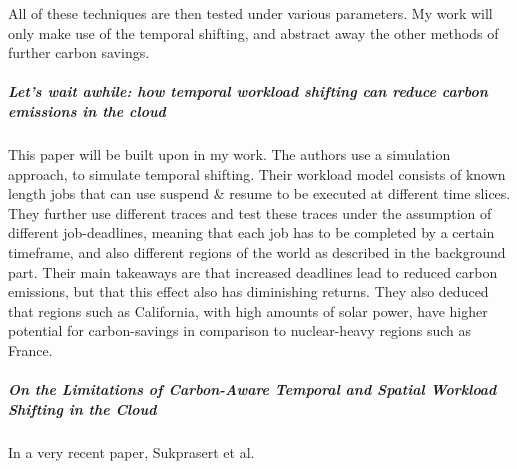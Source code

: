 All of these techniques are then tested under various parameters. My work will only make use of the temporal shifting, and abstract away the other methods of further carbon savings.

\subparagraph{Let's wait awhile: how temporal workload shifting can reduce carbon emissions in the cloud} This paper will be built upon in my work.
The authors \cite{wiesner_lets_2021} use a simulation approach, to simulate temporal shifting. Their workload model consists of known length jobs that can use suspend \& resume to be executed at different time slices. 
They further use different traces and test these traces under the assumption of different job-deadlines, meaning that each job has to be completed by a certain timeframe, and also different regions of the world as described in the background part. 
Their main takeaways are that increased deadlines lead to reduced carbon emissions, but that this effect also has diminishing returns. 
They also deduced that regions such as California, with high amounts of solar power, have higher potential for carbon-savings in comparison to nuclear-heavy regions such as France.

\subparagraph{On the Limitations of Carbon-Aware Temporal and Spatial Workload Shifting in the Cloud} 
In a very recent paper, Sukprasert et al. \cite{sukprasert_limitations_2024}


